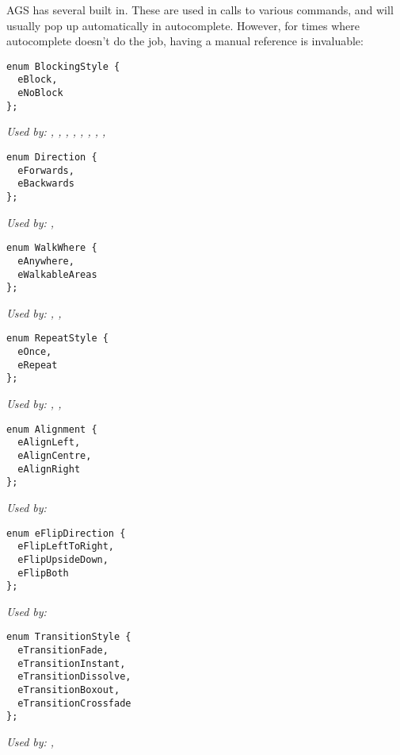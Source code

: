 AGS has several  built in. These are used in calls to
various commands, and will usually pop up automatically in autocomplete. However, for times
where autocomplete doesn't do the job, having a manual reference is invaluable:

\begin{verbatim}
enum BlockingStyle {
  eBlock,
  eNoBlock
};
\end{verbatim}
\it{Used by:} ,
,
,
,
,
,
,
,

\begin{verbatim}
enum Direction {
  eForwards,
  eBackwards
};
\end{verbatim}
\it{Used by:} ,

\begin{verbatim}
enum WalkWhere {
  eAnywhere,
  eWalkableAreas
};
\end{verbatim}
\it{Used by:} ,
,

\begin{verbatim}
enum RepeatStyle {
  eOnce,
  eRepeat
};
\end{verbatim}
\it{Used by:} ,
,

\begin{verbatim}
enum Alignment {
  eAlignLeft,
  eAlignCentre,
  eAlignRight
};
\end{verbatim}
\it{Used by:} 

\begin{verbatim}
enum eFlipDirection {
  eFlipLeftToRight,
  eFlipUpsideDown,
  eFlipBoth
};
\end{verbatim}
\it{Used by:} 

\begin{verbatim}
enum TransitionStyle {
  eTransitionFade,
  eTransitionInstant,
  eTransitionDissolve,
  eTransitionBoxout,
  eTransitionCrossfade
};
\end{verbatim}
\it{Used by:} ,

